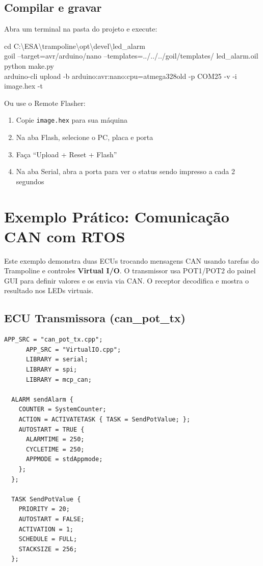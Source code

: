 \documentclass[12pt,a4paper]{article}
\begin{document}
\subsection{Compilar e gravar}

Abra um terminal na pasta do projeto e execute:

\begin{codigobox}
cd C:\textbackslash ESA\textbackslash trampoline\textbackslash opt\textbackslash devel\textbackslash led\_alarm\\[4pt]
goil --target=avr/arduino/nano --templates=../../../goil/templates/ led\_alarm.oil\\[4pt]
python make.py\\[4pt]
arduino-cli upload -b arduino:avr:nano:cpu=atmega328old -p COM25 -v -i image.hex -t
\end{codigobox}

Ou use o Remote Flasher:
\begin{enumerate}[nosep]
  \item Copie \texttt{image.hex} para sua máquina
  \item Na aba Flash, selecione o PC, placa e porta
  \item Faça ``Upload + Reset + Flash''
  \item Na aba Serial, abra a porta para ver o status sendo impresso a cada 2 segundos
\end{enumerate}

\section{Exemplo Prático: Comunicação CAN com RTOS}

Este exemplo demonstra duas ECUs trocando mensagens CAN usando tarefas do Trampoline e controles \textbf{Virtual I/O}. O transmissor usa POT1/POT2 do painel GUI para definir valores e os envia via CAN. O receptor decodifica e mostra o resultado nos LEDs virtuais.

\subsection{ECU Transmissora (can\_pot\_tx)}

\begin{lstlisting}[language=OIL,caption={can\_pot\_tx.oil (trecho relevante)}]
      APP_SRC = "can_pot_tx.cpp";
      APP_SRC = "VirtualIO.cpp";
      LIBRARY = serial;
      LIBRARY = spi;
      LIBRARY = mcp_can;

  ALARM sendAlarm {
    COUNTER = SystemCounter;
    ACTION = ACTIVATETASK { TASK = SendPotValue; };
    AUTOSTART = TRUE {
      ALARMTIME = 250;
      CYCLETIME = 250;
      APPMODE = stdAppmode;
    };
  };

  TASK SendPotValue {
    PRIORITY = 20;
    AUTOSTART = FALSE;
    ACTIVATION = 1;
    SCHEDULE = FULL;
    STACKSIZE = 256;
  };
\end{lstlisting}
\end{document}
